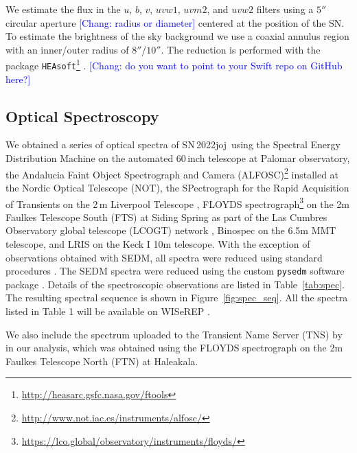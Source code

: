 \documentclass[twocolumn]{aastex631}
\newcommand{\sn}{SN\,2022joj}
\newcommand{\chang}[1]{\textcolor{blue}{[Chang: #1]}}
\begin{document}
\begin{CJK*}{UTF8}{gbsn}
We estimate the flux in the $u$, $b$, $v$, $uvw1$, $uvm2$, and $uvw2$ filters using a $5''$ circular aperture \chang{radius or diameter} centered at the position of the SN. To estimate the brightness of the sky background we use a coaxial annulus region with an inner/outer radius of $8''$/$10''$. The reduction is performed with the package \texttt{HEAsoft}\footnote{\url{http://heasarc.gsfc.nasa.gov/ftools}} \citep{HEAsoft_2014}. \chang{do you want to point to your Swift repo on GitHub here?}

\subsection{Optical Spectroscopy}\label{sec:optical_spec}

We obtained a series of optical spectra of \sn\ using the Spectral Energy Distribution Machine \citep[SEDM;][]{SEDM_2018} on the automated 60\,inch telescope \citep[P60;][]{P60_2006} at Palomar observatory, the Andalucia Faint Object Spectrograph and Camera (ALFOSC)\footnote{\url{http://www.not.iac.es/instruments/alfosc/}} installed at the Nordic Optical Telescope (NOT), the SPectrograph for the Rapid Acquisition of Transients \citep[SPRAT;][]{SPRAT_2014} on the 2\,m Liverpool Telescope \citep[LT;][]{LT_2004}, FLOYDS spectrograph\footnote{\url{https://lco.global/observatory/instruments/floyds/}} on the 2m Faulkes Telescope South (FTS) at Siding Spring as part of the Las Cumbres Observatory global telescope (LCOGT) network \citep{LCOGT_2013}, Binospec on the 6.5m MMT telescope, and LRIS on the Keck I 10m telescope. With the exception of observations obtained with SEDM, all spectra were reduced using standard procedures \citep[e.g.,][]{Matheson_2000}. The SEDM spectra were reduced using the custom \texttt{pysedm} software package \citep{Rigault_pysedm_2019}. Details of the spectroscopic observations are listed in Table~\ref{tab:spec}. The resulting spectral sequence is shown in Figure~\ref{fig:spec_seq}. All the spectra listed in Table 1 will be available on WISeREP \citep{wiserep_2012}.

We also include the spectrum uploaded to the Transient Name Server (TNS) by \citet{Newsome_2022TNSCR} in our analysis, which was obtained using the FLOYDS spectrograph on the 2m Faulkes Telescope North (FTN) at Haleakala.


\end{CJK*}
\end{document}
